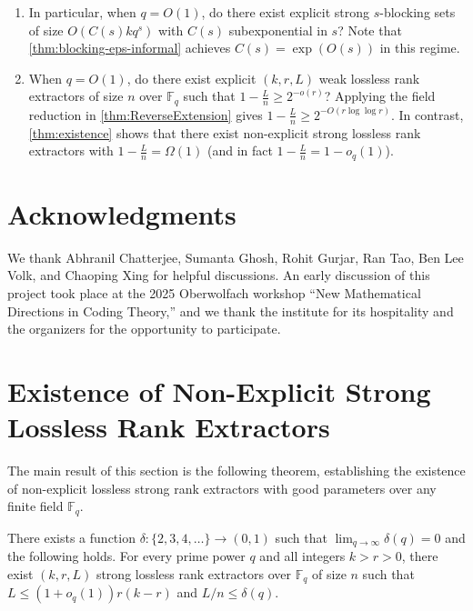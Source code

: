 \documentclass[11pt]{article}
\newcommand{\F}{\mathbb{F}}
\begin{document}
\begin{enumerate}
\item In particular, when $q=O(1)$, do there exist explicit strong $s$-blocking sets of size $O(C(s) k q^s)$ with $C(s)$ subexponential in $s$? Note that \cref{thm:blocking-eps-informal} achieves $C(s)=\exp(O(s))$ in this regime.

\item When $q=O(1)$, do there exist explicit $(k,r,L)$ weak lossless rank extractors of size $n$ over $\F_q$ such that $1-\frac{L}{n}\geq 2^{-o(r)}$?
Applying the field reduction in \cref{thm:ReverseExtension} gives
$1-\frac{L}{n}\geq 2^{-O(r\log\log r)}$.
In contrast, \cref{thm:existence} shows that there exist non-explicit strong lossless rank extractors with
$1-\frac{L}{n}=\Omega(1)$ (and in fact $1-\frac{L}{n}=1-o_q(1)$).
\end{enumerate}

\section*{Acknowledgments} We thank Abhranil Chatterjee, Sumanta Ghosh, Rohit Gurjar, Ran Tao, Ben Lee Volk, and Chaoping Xing for helpful discussions. An early discussion of this project took place at the 2025 Oberwolfach workshop “New Mathematical Directions in Coding Theory,” and we thank the institute for its hospitality and the organizers for the opportunity to participate.




\appendix
{}


\section{Existence of Non-Explicit Strong Lossless Rank Extractors}\label{sec:existence}

The main result of this section is the following theorem, establishing the existence of non-explicit lossless strong rank extractors with good parameters over any finite field $\F_q$.

\begin{theorem}\label{thm:existence}
There exists a function $\delta:\{2,3,4,\dots\}\to (0,1)$ such that
$\lim_{q\to\infty}\delta(q)=0$ and the following holds.
For every prime power $q$ and all integers $k>r>0$,
there exist $(k,r,L)$ strong lossless rank extractors over $\F_q$ of size $n$ such that
$L\leq (1+o_q(1))r(k-r)$ and $L/n\le \delta(q)$.
\end{theorem}
\end{document}
